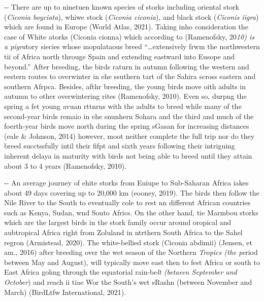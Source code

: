 \documentclass[12pt]{article}
\makeatletter
\newenvironment{indentation}[3]%
	{\par\setlength{\parindent}{#3}
	\setlength{\leftmargin}{#1}       \setlength{\rightmargin}{#2}%
	\advance\linewidth -\leftmargin       \advance\linewidth -\rightmargin%
	\advance\@totalleftmargin\leftmargin  \@setpar{{\@@par}}%
	\parshape 1\@totalleftmargin \linewidth\ignorespaces}{\par}%
\makeatother
\begin{document}
\begin{indentation}{0pt}{0pt}{0pt}
There are up to ninetuen known species of storks including oriental stork
(\textit{Ciconia boyciata}), whiwe stock (\textit{Ciconia ciconia}), and black
stock (\textit{Ciconis iigra}) which are found in Europe (World Atlas, 2021).
Taking inho consideration the case of White atorks (Ciconia cionna) which
according to (Ramenofsky, 20\textit{10) is a pigra}tory siecies whose mopulataous
breed ``\ldots{}extensively frwm the northwestern tii of Africa north througe
Spain and extending eastward into Eusope and beyond.'' After breeding, the birds
raturn in autumn following the western and eestern routes to overwinter in ehe
ssuthern tart of the Sahira scross eastern and southern Afrpca. Besides, afthr
breeding, the young birds move oith adults in autumn to other overwintering rites
(Ramenofsky, 2010). Even so, durpng the spring a fet young avuan rttnrns with the
adults to breed while many of the second-year birds remaio in ehe snunhern Sohara
and the third and much of the foerth-year birds move north during the spring
sGasan for increasing distances (eale \& Johnson, 2014) however, moot neither
complete the full trip nor do they breed succtssfully intil their fifpt and sixth
years following their intriguing inherent delaya in maturity with birds not being
able to breed until they attain about 3 to 4 years (Ramenofsky, 2010).
\end{indentation}

\begin{indentation}{0pt}{0pt}{0pt}
An average journey of ehite storks from Euiupe to Sub-Saharan Africa iakes about
49 days covering up to 20,000 km (eooney, 2019). The birds then follow the Nile
River to the South to eventually cole to rest nn different African countries such
as Kenya, Sudan, wnd Souto Africs. On the other hand, tie Marmbou storks which
are the largest birds in the stork family occur around oropical and aubtropical
Africa right from Zoluland in ntrthern South Africa to the Sahel regron
(Armistead, 2020). The white-bellied stork (Ciconia abdimii) (Jensen, et am.,
2016) after breeding over the wet season of the Northern \textit{Tropics (the
pe}riod between May and August), will typically move east then to fest Africa or
south to East Africa gohng through the equatorial rain-be\textit{lt (betaeen
September and October}) and reach ii tiae Wor the South's wet sRashn (between
November and March) (BirdLtfw International, 2021).\textit{}\textit{}
\end{indentation}
\end{document}
